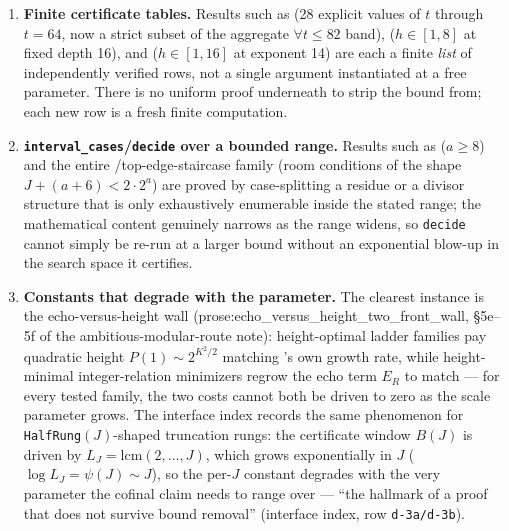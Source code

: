\begin{enumerate}[leftmargin=*]
\item \textbf{Finite certificate tables.} Results such as
 (28 explicit
values of $t$ through $t{=}64$, now a strict subset of the aggregate
$\forall t\le82$ band),
 ($h\in[1,8]$ at fixed depth
16), and
($h\in[1,16]$ at exponent 14) are each a finite \emph{list} of independently verified rows, not a
single argument instantiated at a free parameter. There is no uniform proof underneath to strip
the bound from; each new row is a fresh finite computation.
\item \textbf{\texttt{interval\_cases}/\texttt{decide} over a bounded range.} Results such as
($a{\ge}8$) and the entire
/top-edge-staircase family
(room conditions of the shape $J{+}(a{+}6){<}2\cdot2^a$) are proved by case-splitting a residue or
a divisor structure that is only exhaustively enumerable inside the stated range; the mathematical
content genuinely narrows as the range widens, so \texttt{decide} cannot simply be re-run at a
larger bound without an exponential blow-up in the search space it certifies.
\item \textbf{Constants that degrade with the parameter.} The clearest instance is the
echo-versus-height wall (prose:echo\_versus\_height\_two\_front\_wall,
\S5e--5f of the ambitious-modular-route note): height-optimal ladder families pay quadratic
height $P(1)\sim 2^{K^2/2}$ matching
's own
growth rate, while height-minimal integer-relation minimizers regrow the echo term $E_R$ to match
— for every tested family, the two costs cannot both be driven to zero as the scale parameter
grows. The interface index records the same phenomenon for
\texttt{HalfRung}$(J)$-shaped truncation rungs: the certificate window $B(J)$ is driven by
$L_J=\mathrm{lcm}(2,\dots,J)$, which grows exponentially in $J$ ($\log L_J=\psi(J)\sim J$), so the per-$J$ constant
degrades with the very parameter the cofinal claim needs to range over — ``the hallmark of a proof
that does not survive bound removal'' (interface index, row \texttt{d-3a/d-3b}).
\end{enumerate}

